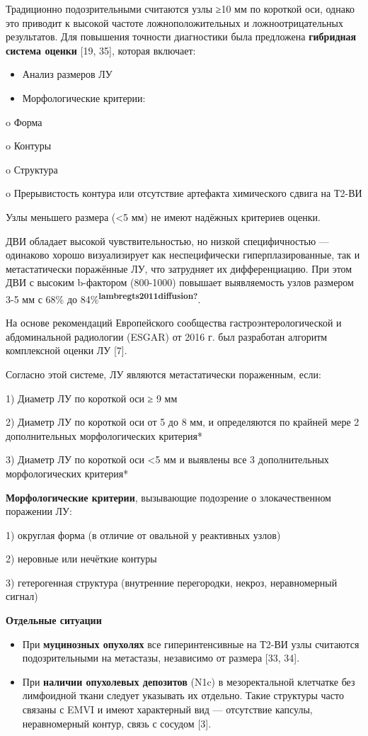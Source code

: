 \documentclass[
  russian,
  12pt,
  a4paper,
]{report}
\begin{document}
Традиционно подозрительными считаются узлы ≥10 мм по короткой оси,
однако это приводит к высокой частоте ложноположительных и
ложноотрицательных результатов. Для повышения точности диагностики была
предложена \textbf{гибридная система оценки} {[}19, 35{]}, которая
включает:

\begin{itemize}
\item
  Анализ размеров ЛУ
\item
  Морфологические критерии:
\end{itemize}

o Форма

o Контуры

o Структура

o Прерывистость контура или отсутствие артефакта химического сдвига на
Т2-ВИ

Узлы меньшего размера (\textless5 мм) не имеют надёжных критериев
оценки.

ДВИ обладает высокой чувствительностью, но низкой специфичностью ---
одинаково хорошо визуализирует как неспецифически гиперплазированные,
так и метастатически поражённые ЛУ, что затрудняет их дифференциацию.
При этом ДВИ с высоким b-фактором (800-1000) повышает выявляемость узлов
размером 3-5 мм с 68\% до
84\%\textsuperscript{\textbf{lambregts2011diffusion?}}.

На основе рекомендаций Европейского сообщества гастроэнтерологической и
абдоминальной радиологии (ESGAR) от 2016 г. был разработан алгоритм
комплексной оценки ЛУ {[}7{]}.

Согласно этой системе, ЛУ являются метастатически пораженным, если:

1) Диаметр ЛУ по короткой оси ≥ 9 мм

2) Диаметр ЛУ по короткой оси от 5 до 8 мм, и определяются по крайней
мере 2 дополнительных морфологических критерия*

3) Диаметр ЛУ по короткой оси \textless5 мм и выявлены все 3
дополнительных морфологических критерия*

\textbf{Морфологические критерии}, вызывающие подозрение о
злокачественном поражении ЛУ:

1) округлая форма (в отличие от овальной у реактивных узлов)

2) неровные или нечёткие контуры

3) гетерогенная структура (внутренние перегородки, некроз, неравномерный
сигнал)

\textbf{Отдельные ситуации}

\begin{itemize}
\item
  При \textbf{муцинозных опухолях} все гиперинтенсивные на Т2-ВИ узлы
  считаются подозрительными на метастазы, независимо от размера {[}33,
  34{]}.
\item
  При \textbf{наличии опухолевых депозитов} (N1c) в мезоректальной
  клетчатке без лимфоидной ткани следует указывать их отдельно. Такие
  структуры часто связаны с EMVI и имеют характерный вид --- отсутствие
  капсулы, неравномерный контур, связь с сосудом {[}3{]}.
\end{itemize}
\end{document}

